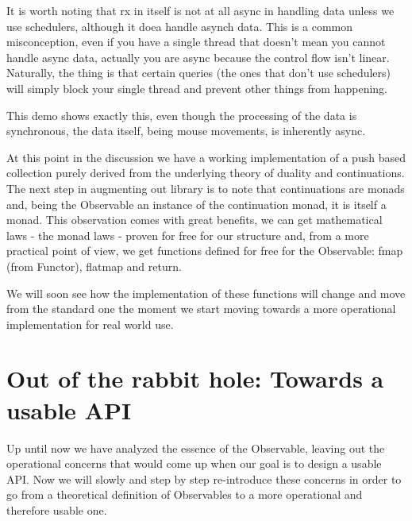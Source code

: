 It is worth noting that rx in itself is not at all async in handling data unless we use schedulers, although it doea handle asynch data. This is a common misconception, even if you have a single thread that doesn't mean you cannot handle async data, actually you are async because the control flow isn't linear. Naturally, the thing is that certain queries (the ones that don't use schedulers) will simply block your single thread and prevent other things from happening.

This demo shows exactly this, even though the processing of the data is synchronous, the data itself, being mouse movements, is inherently async.

At this point in the discussion we have a working implementation of a push based collection purely derived from the underlying theory of duality and continuations. The next step in augmenting out library is to note that continuations are monads and, being the Observable an instance of the continuation monad, it is itself a monad. This observation comes with great benefits, we can get mathematical laws - the monad laws - proven for free for our structure and, from a more practical point of view, we get functions defined for free for the Observable: fmap (from Functor), flatmap and return.


We will soon see how the implementation of these functions will change and move from the standard one the moment we start moving towards a more operational implementation for real world use.

\section{Out of the rabbit hole: Towards a usable API}
\label{sec:sec04}


Up until now we have analyzed the essence of the Observable, leaving out the operational concerns that would come up when our goal is to design a usable API. Now we will slowly and step by step re-introduce these concerns in order to go from a theoretical definition of Observables to a more operational and therefore usable one.

